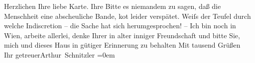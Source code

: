 \begin{ledgroupsized}[t]{13cm}
           \pstart
           {\pb}Herzlichen  Ihre liebe Karte. Ihre Bitte es niemandem zu sagen, daß die Menschheit eine
               abscheuliche Bande, ko{\geminationm}t leider verspätet. Weiſs der
               Teufel durch welche Indiscretion – die Sache hat sich herumgesprochen!\pend
           \pstart
           – Ich bin noch in Wien, arbeite allerlei, denke
               Ihrer in alter inniger Freundschaft und bitte Sie, mich und {\pb}dieses Haus in gütiger Erinnerung zu behalten\pend
           \pstart
           Mit tausend Grüßen{\\[\baselineskip]}Ihr getreuer\spacefill\mbox{Arthur Schnitzler}\pend
           \leftskip=0em{}
         
         \endnumbering{}\end{ledgroupsized}  \newcommand{\dateiname}{L02446}\newcommand{\titel}{Arthur Schnitzler an Georg Brandes, 2[7?]. 7. 1925}\newcommand{\editorInnen}{Martin Anton Müller und Gerd-Hermann Susen}
      